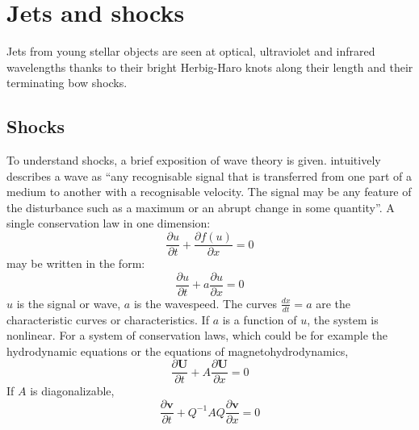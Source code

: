 \section{Jets and shocks}
Jets from young stellar objects are seen at optical, ultraviolet and infrared wavelengths thanks to their bright Herbig-Haro knots along their length and their terminating bow shocks.

\subsection{Shocks}


To understand shocks, a brief exposition of wave theory is given.
\citet{1974whitham} intuitively describes a wave as ``any recognisable signal that is transferred from one part of a medium to another with a recognisable velocity.  The signal may be any feature of the disturbance such as a maximum or an abrupt change in some quantity''.
A single conservation law in one dimension:
\begin{equation}
\frac{\partial u}{ \partial t}
+
 \frac{\partial f\left(u\right)}{ \partial x}
=0
\end{equation}
may be written in the form:
\begin{equation}
\frac{\partial u}{ \partial t}
+
a \frac{\partial u}{ \partial x}
=0
\end{equation}
$u$ is the signal or wave,
$a$ is the wavespeed.
The curves $\frac{dx}{dt}=a$ are the characteristic curves or characteristics.
If $a$ is a function of $u$, the system is nonlinear.
For a system of conservation laws, which could be for example the hydrodynamic equations or the equations of magnetohydrodynamics,
\begin{equation}
\frac{\partial \mathbf{U} }{ \partial t}
+
A \frac{\partial \mathbf{U}}{ \partial x}
=0
\end{equation}
If $A$ is diagonalizable,
\begin{equation}
\frac{\partial \mathbf{v} }{ \partial t}
+
Q^{-1}AQ \frac{\partial \mathbf{v}}{ \partial x}
=0
\end{equation}
